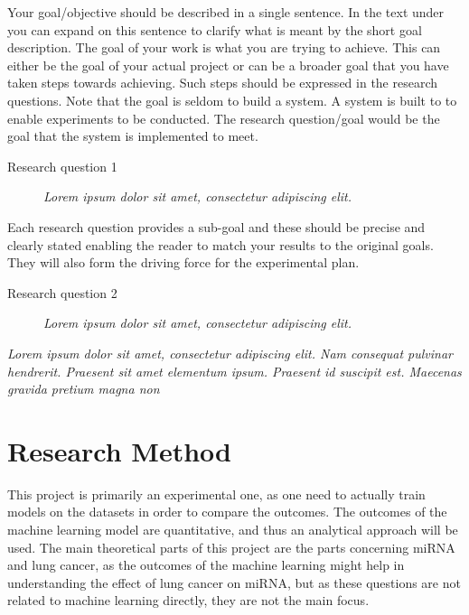 Your goal/objective should be described in a single sentence. In the text under you can expand on this sentence to clarify what is meant by the short goal description. 
The goal of your work is what you are trying to achieve. This can either be the goal of your actual project or can be a broader goal that you have taken steps towards achieving. Such steps should be expressed in the research questions. 
Note that the goal is seldom to build a system. A system is built to to enable experiments to be conducted. The research question/goal would be the goal that the system is implemented to meet.  


\begin{description}
\item[Research question 1] {\it Lorem ipsum dolor sit amet, consectetur adipiscing elit.}
\end{description}

Each research question provides a sub-goal and these should be precise and clearly stated enabling the reader to match your results to the original goals. They will also form the driving force for the experimental plan. 

\begin{description}
\item[Research question 2] {\it Lorem ipsum dolor sit amet, consectetur adipiscing elit.}
\end{description}

{\it Lorem ipsum dolor sit amet, consectetur adipiscing elit. Nam consequat pulvinar hendrerit. Praesent sit amet elementum ipsum. Praesent id suscipit est. Maecenas gravida pretium magna non }
\fi

\section{Research Method}
\label{sec:researchMethod}

This project is primarily an experimental one, as one need to actually train models on the datasets in order to compare the outcomes. The outcomes of the machine learning model are quantitative, and thus an analytical approach will be used. The main theoretical parts of this project are the parts concerning miRNA and lung cancer, as the outcomes of the machine learning might help in understanding the effect of lung cancer on miRNA, but as these questions are not related to machine learning directly, they are not the main focus.
\iffalse
What methodology will you apply to address the goals: theoretic/analytic, model/abstraction or design/experiment? This section will describe the research methodology applied and the reason for this choice of research methodology.  
\fi

